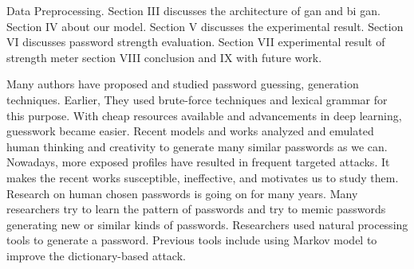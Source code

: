\documentclass[runningheads]{llncs}
\begin{document}
Data Preprocessing. Section III discusses the architecture of gan and bi gan. Section IV about our model. Section V discusses the experimental result. Section VI discusses password strength evaluation. Section VII experimental result of strength meter section VIII conclusion and IX with future work.


Many authors have proposed and studied password guessing, generation techniques. Earlier, They used brute-force techniques and lexical grammar for this purpose. With cheap resources available and advancements in deep learning, guesswork became easier. Recent models and works analyzed and emulated human thinking and creativity to generate many similar passwords as we can. Nowadays, more exposed profiles have resulted in frequent targeted attacks. It makes the recent works susceptible, ineffective, and motivates us to study them. Research on human chosen passwords is going on for many years. Many researchers try to learn the pattern of passwords and try to memic passwords generating new or similar kinds of passwords. Researchers used natural processing tools to generate a password. Previous tools include using Markov model \cite{Narayanan:2005:FDA:1102120.1102168} to improve the dictionary-based attack.
\end{document}
